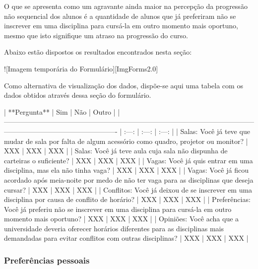         O que se apresenta como um agravante ainda maior na percepção da progressão não sequencial dos alunos é a quantidade de alunos que já preferiram não se inscrever em uma disciplina para cursá-la em outro momento mais oportuno, mesmo que isto signifique um atraso na progressão do curso.

        Abaixo estão dispostos os resultados encontrados nesta seção:

        ![Imagem temporária do Formulário][ImgForms2.0]

        Como alternativa de visualização dos dados, dispõe-se aqui uma tabela com os dados obtidos através dessa seção do formulário.

        | **Pergunta**                                                                                                                                                  |  Sim  |  Não  | Outro |
        | ------------------------------------------------------------------------------------------------------------------------------------------------------------- | :---: | :---: | :---: |
        | Salas: Você já teve que mudar de sala por falta de algum acessório como quadro, projetor ou monitor?                                                          |  XXX  |  XXX  |  XXX  |
        | Salas: Você já teve aula cuja sala não dispunha de carteiras o suficiente?                                                                                    |  XXX  |  XXX  |  XXX  |
        | Vagas: Você já quis entrar em uma disciplina, mas ela não tinha vaga?                                                                                         |  XXX  |  XXX  |  XXX  |
        | Vagas: Você já ficou acordado após meia-noite por medo de não ter vaga para as disciplinas que deseja cursar?                                                 |  XXX  |  XXX  |  XXX  |
        | Conflitos: Você já deixou de se inscrever em uma disciplina por causa de conflito de horário?                                                                 |  XXX  |  XXX  |  XXX  |
        | Preferências: Você já preferiu não se inscrever em uma disciplina para cursá-la em outro momento mais oportuno?                                               |  XXX  |  XXX  |  XXX  |
        | Opiniões: Você acha que a universidade deveria oferecer horários diferentes para as disciplinas mais demandadas para evitar conflitos com outras disciplinas? |  XXX  |  XXX  |  XXX  |

    \subsubsection{Preferências pessoais} %

